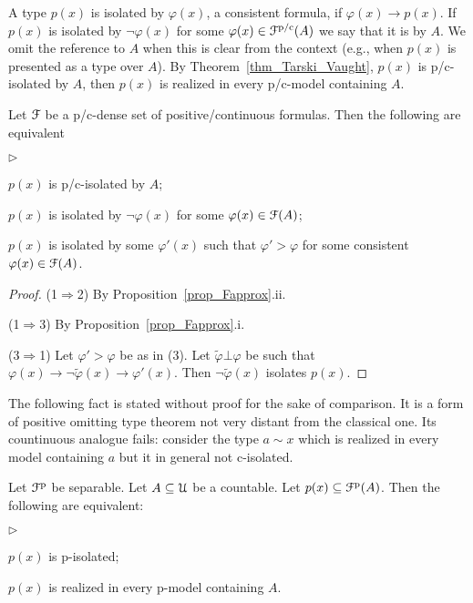 \documentclass{amsproc}
\newcommand{\mylabel}[1]{{#1}\hfill}
\renewenvironment{itemize}
  {\begin{list}{$\triangleright$}{%
  \setlength{\parskip}{0mm}
  \setlength{\topsep}{.4\baselineskip}
  \setlength{\rightmargin}{0mm}
  \setlength{\listparindent}{0mm}
  \setlength{\itemindent}{0mm}
  \setlength{\labelwidth}{3ex}
  \setlength{\itemsep}{.2\baselineskip}
  \setlength{\parsep}{.2\baselineskip}
  \setlength{\partopsep}{0mm}
  \setlength{\labelsep}{1ex}
  \setlength{\leftmargin}{\labelwidth+\labelsep}
  \let\makelabel\mylabel}}{%
\end{list}}
\renewcommand*{\emph}[1]{%
   \smash{\tikz[baseline]\node[rectangle, fill=teal!25, rounded corners, inner xsep=0.5ex, inner ysep=0.2ex, anchor=base, minimum height = 2.7ex]{\strut #1};}}
\begin{document}
{A type $p(x)$ is isolated by $\varphi(x)$, a consistent formula, if $\varphi(x)\rightarrow p(x)$.
If $p(x)$ is isolated by $\neg\varphi(x)$ for some $\varphi(x)\in{\EuScript F}^{\rm p/c}(A)$ we say that it is \emph{p/c-isolated\/} by $A$.
We omit the reference to $A$ when this is clear from the context (e.g., when $p(x)$ is presented as a type over $A$).
By Theorem~\ref{thm_Tarski_Vaught}, $p(x)$ is p/c-isolated by $A$, then $p(x)$ is realized in every p/c-model containing $A$.

\begin{fact}\label{fact_isolation}
  Let ${\EuScript F}$ be a p/c-dense set of positive/continuous formulas.
  Then the following are equivalent
  \begin{itemize}
  \item[1.] $p(x)$ is p/c-isolated by $A$;
  \item[2.] $p(x)$ is isolated by $\neg\varphi(x)$ for some $\varphi(x)\in{\EuScript F}(A)$;
  \item[3.] $p(x)$ is isolated by some $\varphi'(x)$ such that  $\varphi'>\varphi$ for some consistent $\varphi(x)\in{\EuScript F}(A)$.
  \end{itemize}
\end{fact}

\begin{proof}
  (1$\Rightarrow$2) By Proposition~\ref{prop_Fapprox}.ii.

  (1$\Rightarrow$3) By Proposition~\ref{prop_Fapprox}.i.

  (3$\Rightarrow$1) Let $\varphi'>\varphi$ be as in (3). 
  Let $\tilde\varphi\bot\varphi$ be such that $\varphi(x)\rightarrow\neg\tilde\varphi(x)\rightarrow\varphi'(x)$. 
  Then $\neg\tilde\varphi(x)$ isolates $p(x)$.
\end{proof}

The following fact is stated without proof for the sake of comparison.
It is a form of positive omitting type theorem not very distant from the classical one.
Its countinuous analogue fails: consider the type $a\sim x$ which is realized in every model containing $a$ but it in general not c-isolated.

\begin{fact}
  Let ${\EuScript F}^{\rm p}$ be separable.
  Let $A\subseteq{\EuScript U}$ be a countable.
  Let $p(x)\subseteq{\EuScript F}^{\rm p}(A)$.
  Then the following are equivalent:
  \begin{itemize}
    \item[1.] $p(x)$ is p-isolated;
    \item[2.] $p(x)$ is realized in every p-model containing $A$.
  \end{itemize}
\end{fact}

}
\end{document}
